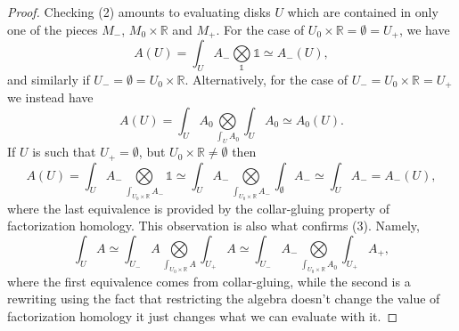 \documentclass[../text]{subfiles}
\begin{document}
\begin{proof}
    Checking (2) amounts to evaluating disks $U$ which are contained in only one of the pieces $M_-$, $M_0 \times \mathbb{R}$ and $M_+$. For the case of $U_0 \times \mathbb{R} = \emptyset = U_+$, we have
    \begin{equation}
        A(U) = \int_{U} A_- \bigotimes\limits_{\mathbb{1}} \mathbb{1} \simeq A_- (U),
    \end{equation}
    and similarly if $U_- = \emptyset = U_0 \times \mathbb{R}$. Alternatively, for the case of $U_- = U_0 \times \mathbb{R} = U_+$ we instead have
    \begin{equation}
        A(U) = \int_U A_0 \bigotimes\limits_{\int_{U} A_0} \int_U A_0 \simeq A_0(U).
    \end{equation}
    If $U$ is such that $U_+ = \emptyset$, but $U_0 \times \mathbb{R} \neq \emptyset$ then
    \begin{equation}
        A(U) = \int_U A_- \bigotimes\limits_{\int_{U_0 \times \mathbb{R}} A_-} \mathbb{1} \simeq \int_U A_- \bigotimes\limits_{\int_{U_0 \times \mathbb{R}} A_-} \int_{\emptyset} A_- \simeq \int_{U} A_- = A_-(U),
    \end{equation}
    where the last equivalence is provided by the collar-gluing property of factorization homology. This observation is also what confirms (3). Namely,
    \begin{equation}
        \int_U A \simeq \int_{U_-} A \bigotimes\limits_{\int_{U_0 \times \mathbb{R}} A} \int_{U_+} A \simeq \int_{U_-} A_- \bigotimes\limits_{\int_{U_0 \times \mathbb{R}} A_0} \int_{U_+} A_+,
    \end{equation}
    where the first equivalence comes from collar-gluing, while the second is a rewriting using the fact that restricting the algebra doesn't change the value of factorization homology it just changes what we can evaluate with it.


\end{proof}
\end{document}
